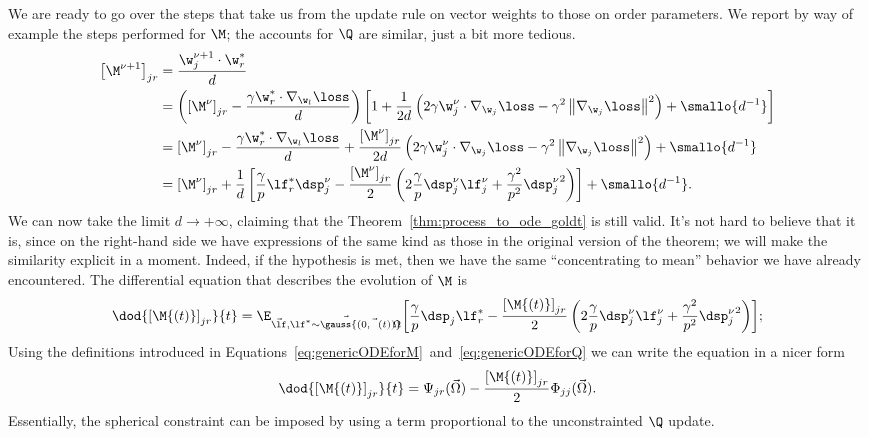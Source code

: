 We are ready to go over the steps that take us from the update rule on vector weights
to those on order parameters. We report by way of example the steps performed for \(\M\);
the accounts for \(\Q\) are similar, just a bit more tedious.
\[\begin{split}
  \left[\M^{\nu+1}\right]_{jr} &= \frac{\w^{\nu+1}_j\cdot\w_r^*}{d} \\
    &= \left(\left[\M^{\nu}\right]_{jr} - \frac{\gamma\w_r^*\cdot\nabla_{\w_l}{\loss}}{d}\right)\left[1+ \frac{1}{2d}\left(2\gamma\w^{\nu}_j\cdot \nabla_{\w_j}{\loss}-\gamma^2\left\|\nabla_{\w_j}{\loss}\right\|^2\right)+\smallo{d^{-1}}\right]\\
    &= \left[\M^{\nu}\right]_{jr} - \frac{\gamma\w_r^*\cdot\nabla_{\w_l}{\loss}}{d} + \frac{\left[\M^{\nu}\right]_{jr}}{2d}\left(2\gamma\w^{\nu}_j\cdot \nabla_{\w_j}{\loss}-\gamma^2\left\|\nabla_{\w_j}{\loss}\right\|^2\right)+\smallo{d^{-1}} \\
    &= \left[\M^{\nu}\right]_{jr} +\frac{1}{d}\left[
      \frac{\gamma}{p} \lf^*_r\dsp^\nu_j -
      \frac{\left[\M^{\nu}\right]_{jr}}{2}\left(2\frac{\gamma}{p}\dsp^\nu_j\lf^\nu_j + \frac{\gamma^2}{p^2} {\dsp^\nu_j}^2\right)
    \right] + \smallo{d^{-1}}.
\end{split}\]
We can now take the limit \(d\to+\infty\), claiming that the Theorem~\ref{thm:process_to_ode_goldt} is still valid.
It's not hard to believe that it is, since on the right-hand side we have expressions of the same kind
as those in the original version of the theorem; we will make the similarity explicit in a moment.
Indeed, if the hypothesis is met, then we have the same ``concentrating to mean'' behavior we have already encountered.
The differential equation that describes the evolution of \(\M\) is
\[
  \dod{\left[\M{\left(t\right)}\right]_{jr}}{t} =\E_{\vec{\lf},\vec{\lf^* \sim \gauss{(0,\vec{\Omega}{(t)})}}}{\left[\frac{\gamma}{p} \dsp_j \lf_r^* - \frac{\left[\M{\left(t\right)}\right]_{jr}}{2}\left(2\frac{\gamma}{p}\dsp^\nu_j\lf^\nu_j + \frac{\gamma^2}{p^2} {\dsp^\nu_j}^2\right)\right]};
\]
Using the definitions introduced in Equations~\eqref{eq:genericODEforM}~and~\eqref{eq:genericODEforQ} we can write the equation in a nicer form
\begin{equation} \label{eq:genericsphericalM}
  \dod{\left[\M{\left(t\right)}\right]_{jr}}{t} = \Psi_{jr}{(\vec{\Omega})} - \frac{\left[\M{\left(t\right)}\right]_{jr}}{2}\Phi_{jj}{(\vec{\Omega})}.
\end{equation}
Essentially, the spherical constraint can be imposed by using a term proportional to the unconstrainted \(\Q\) update.

